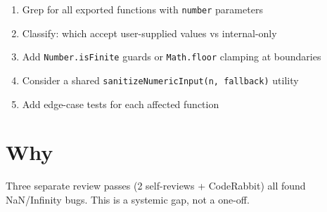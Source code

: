 \begin{enumerate}
\def\labelenumi{\arabic{enumi}.}
\tightlist
\item
  Grep for all exported functions with \texttt{n\allowbreak{}u\allowbreak{}m\allowbreak{}b\allowbreak{}e\allowbreak{}r} parameters
\item
  Classify: which accept user-supplied values vs internal-only
\item
  Add \texttt{N\allowbreak{}u\allowbreak{}m\allowbreak{}b\allowbreak{}e\allowbreak{}r\allowbreak{}.\allowbreak{}i\allowbreak{}s\allowbreak{}F\allowbreak{}i\allowbreak{}n\allowbreak{}i\allowbreak{}t\allowbreak{}e} guards or \texttt{M\allowbreak{}a\allowbreak{}t\allowbreak{}h\allowbreak{}.\allowbreak{}f\allowbreak{}l\allowbreak{}o\allowbreak{}o\allowbreak{}r} clamping at boundaries
\item
  Consider a shared \texttt{s\allowbreak{}a\allowbreak{}n\allowbreak{}i\allowbreak{}t\allowbreak{}i\allowbreak{}z\allowbreak{}e\allowbreak{}N\allowbreak{}u\allowbreak{}m\allowbreak{}e\allowbreak{}r\allowbreak{}i\allowbreak{}c\allowbreak{}I\allowbreak{}n\allowbreak{}p\allowbreak{}u\allowbreak{}t\allowbreak{}(\allowbreak{}n\allowbreak{},\allowbreak{} \allowbreak{}f\allowbreak{}a\allowbreak{}l\allowbreak{}l\allowbreak{}b\allowbreak{}a\allowbreak{}c\allowbreak{}k\allowbreak{})} utility
\item
  Add edge-case tests for each affected function
\end{enumerate}

\section{Why}\label{record-308-why}

Three separate review passes (2 self-reviews + CodeRabbit) all found NaN/Infinity bugs. This is a systemic gap, not a one-off.

